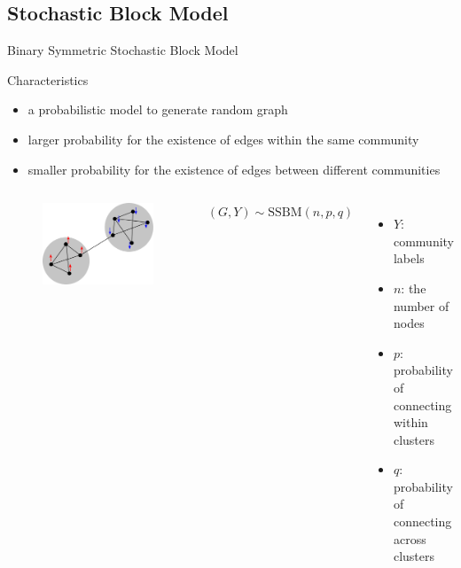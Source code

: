 \documentclass{beamer}
\begin{document}
\subsection{Stochastic Block Model}
\begin{frame}{Binary Symmetric Stochastic Block Model}
	\begin{block}{Characteristics}
		\begin{itemize}
		\item a probabilistic model to generate random graph
		\item larger probability for the existence of edges within the same community
		\item smaller probability for the existence of edges between different communities
		\end{itemize}
		\end{block}
		\begin{columns}
				\begin{figure}
				\includegraphics[width=\textwidth]{sbm.png}
			\end{figure}
		\quad$(G,Y)\sim \textrm{SSBM}(n, p, q)$
		\begin{itemize}
			\item $Y$: community labels
			\item $n$: the number of nodes
			\item $p$: probability of connecting within clusters
			\item $q$: probability of connecting across clusters
		\end{itemize}
		\end{columns}	
\end{frame}
\end{document}
